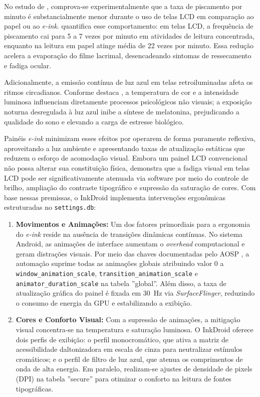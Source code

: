 \documentclass[
    12pt,
    openright,
    oneside,
    a4paper,
    english,
    brazilian
    ]{abntex2}
\begin{document}
No estudo de , comprova-se experimentalmente que a taxa de piscamento por minuto é substancialmente menor durante o uso de telas LCD em comparação ao papel ou ao \textit{e-ink}.  quantifica esse comportamento: em telas LCD, a frequência de piscamento cai para 5 a 7 vezes por minuto em atividades de leitura concentrada, enquanto na leitura em papel atinge média de 22 vezes por minuto. Essa redução acelera a evaporação do filme lacrimal, desencadeando sintomas de ressecamento e fadiga ocular.

Adicionalmente, a emissão contínua de luz azul em telas retroiluminadas afeta os ritmos circadianos. Conforme destaca , a temperatura de cor e a intensidade luminosa influenciam diretamente processos psicológicos não visuais; a exposição noturna desregulada à luz azul inibe a síntese de melatonina, prejudicando a qualidade do sono e elevando a carga de estresse biológico.

Painéis \textit{e-ink} minimizam esses efeitos por operarem de forma puramente reflexiva, aproveitando a luz ambiente e apresentando taxas de atualização estáticas que reduzem o esforço de acomodação visual. Embora um painel LCD convencional não possa alterar sua constituição física,  demonstra que a fadiga visual em telas LCD pode ser significativamente atenuada via software por meio do controle de brilho, ampliação do contraste tipográfico e supressão da saturação de cores. Com base nessas premissas, o InkDroid implementa intervenções ergonômicas estruturadas no \texttt{settings.db}:

\begin{enumerate}
  \item \textbf{Movimentos e Animações:} Um dos fatores primordiais para a ergonomia do \textit{e-ink} reside na ausência de transições dinâmicas contínuas. No sistema Android, as animações de interface aumentam o \textit{overhead} computacional e geram distrações visuais. Por meio das chaves documentadas pelo AOSP \cite{android2025}, a automação suprime todas as animações globais atribuindo valor 0 a \texttt{window\_animation\_scale}, \texttt{transition\_animation\_scale} e \texttt{animator\_duration\_scale} na tabela ''global''. Além disso, a taxa de atualização gráfica do painel é fixada em 30~Hz via \textit{SurfaceFlinger}, reduzindo o consumo de energia da GPU e estabilizando a exibição.

  \item \textbf{Cores e Conforto Visual:} Com a supressão de animações, a mitigação visual concentra-se na temperatura e saturação luminosa. O InkDroid oferece dois perfis de exibição: o perfil monocromático, que ativa a matriz de acessibilidade daltonizadora em escala de cinza para neutralizar estímulos cromáticos; e o perfil de filtro de luz azul, que atenua os comprimentos de onda de alta energia. Em paralelo, realizam-se ajustes de densidade de pixels (DPI) na tabela ''secure'' para otimizar o conforto na leitura de fontes tipográficas.
\end{enumerate}
\end{document}
